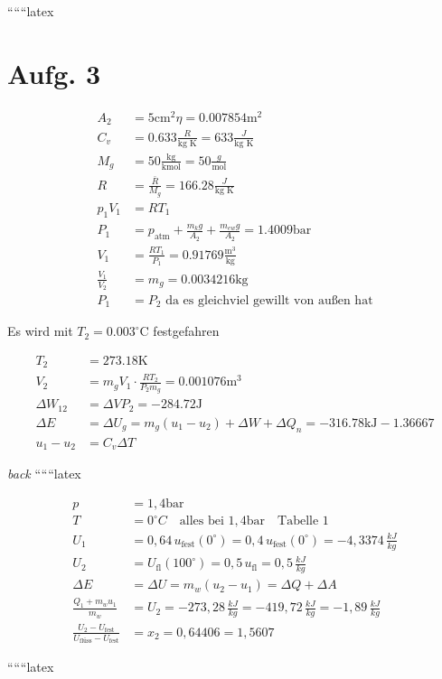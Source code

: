 
``````latex


\section*{Aufg. 3}

\begin{align*}
A_2 &= 5 \text{cm}^2 \eta = 0.007854 \text{m}^2 \\
C_v &= 0.633 \frac{R}{\text{kg K}} = 633 \frac{J}{\text{kg K}} \\
M_g &= 50 \frac{\text{kg}}{\text{kmol}} = 50 \frac{g}{\text{mol}} \\
R &= \frac{\bar{R}}{M_g} = 166.28 \frac{J}{\text{kg K}} \\
p_1 V_1 &= R T_1 \\
P_1 &= p_{\text{atm}} + \frac{m_k g}{A_2} + \frac{m_{ew} g}{A_2} = 1.4009 \text{bar} \\
V_1 &= \frac{R T_1}{P_1} = 0.91769 \frac{\text{m}^3}{\text{kg}} \\
\frac{V_1}{V_2} &= m_g = 0.0034216 \text{kg} \\
P_1 &= P_2 \text{ da es gleichviel gewillt von außen hat}
\end{align*}

\noindent
Es wird mit $T_2 = 0.003^\circ \text{C}$ festgefahren

\begin{align*}
T_2 &= 273.18 \text{K} \\
V_2 &= m_g V_1 \cdot \frac{R T_2}{P_2 m_g} = 0.001076 \text{m}^3 \\
\Delta W_{12} &= \Delta V P_2 = -284.72 \text{J} \\
\Delta E &= \Delta U_g = m_g (u_1 - u_2) + \Delta W + \Delta Q_n = -316.78 \text{kJ} - 1.36667 \\
u_1 - u_2 &= C_v \Delta T
\end{align*}

\noindent
\textit{back}
``````latex

\begin{align*}
p &= 1,4 \text{bar} \\
T &= 0^\circ C \quad \text{alles bei } 1,4 \text{bar} \quad \text{Tabelle 1} \\
U_1 &= 0,64 \, u_{\text{fest}}(0^\circ) = 0,4 \, u_{\text{fest}}(0^\circ) = -4,3374 \, \frac{kJ}{kg} \\
U_2 &= U_{\text{fl}}(100^\circ) = 0,5 \, u_{\text{fl}} = 0,5 \, \frac{kJ}{kg} \\
\Delta E &= \Delta U = m_w (u_2 - u_1) = \Delta Q + \Delta A \\
\frac{Q_1 + m_w u_1}{m_w} &= U_2 = -273,28 \, \frac{kJ}{kg} = -419,72 \, \frac{kJ}{kg} = -1,89 \, \frac{kJ}{kg} \\
\frac{U_2 - U_{\text{fest}}}{U_{\text{flüss}} - U_{\text{fest}}} &= x_2 = 0,64406 = 1,5607
\end{align*}

``````latex



